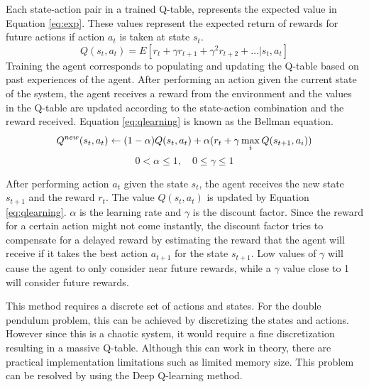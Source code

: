 \documentclass[final]{LTHtwocol} %
\begin{document}
Each state-action pair in a trained Q-table, represents the expected value in Equation \eqref{eq:exp}. These values represent the expected return of rewards for future actions if action $a_t$ is taken at state $s_t$.
\begin{equation}
Q(s_t,a_t) = E[r_t + \gamma r_{t+1} + \gamma^2 r_{t+2} + \hdots | s_t,a_t] 
\label{eq:exp}
\end{equation}
Training the agent corresponds to populating and updating the Q-table based on past experiences of the agent.
After performing an action given the current state of the system, the agent receives a reward from the environment and the values in the Q-table are updated according to the state-action combination and the reward received.
Equation \eqref{eq:qlearning} is known as the Bellman equation.
\begin{equation}
Q^{new}(s_t,a_t) \leftarrow (1 - \alpha)Q(s_t,a_t) + \alpha (r_t + \gamma \max_i Q(s_{t+1},a_i )) \\
\label{eq:qlearning} 
\end{equation}
\[ 0 < \alpha \leq 1, \quad 0 \leq \gamma \leq 1  \]

After performing action $a_t$ given the state $s_t$, the agent receives the new state $s_{t+1}$ and the reward $r_t$. The value $Q(s_t,a_t)$ is updated by Equation \eqref{eq:qlearning}. $\alpha$ is the learning rate and $\gamma$ is the discount factor. Since the reward for a certain action might not come instantly, the discount factor tries to compensate for a delayed reward by estimating the reward that the agent will receive if it takes the best action $a_{t+1}$ for the state $s_{t+1}$. Low values of $\gamma$ will cause the agent to only consider near future rewards, while a $\gamma$ value close to 1 will consider future rewards.


This method requires a discrete set of actions and states.
For the double pendulum problem, this can be achieved by discretizing the states and actions.
However since this is a chaotic system, it would require a fine discretization resulting in a massive Q-table.
Although this can work in theory, there are practical implementation limitations such as limited memory size.
This problem can be resolved by using the Deep Q-learning method.
\end{document}

